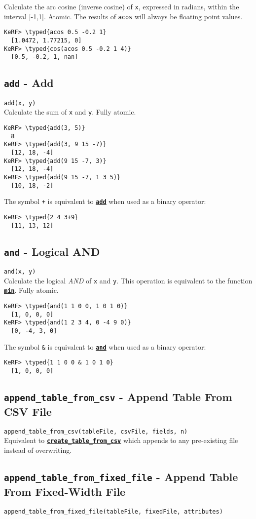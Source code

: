 \documentclass{article}
\newcommand{\typed}[1]{\textcolor{TealBlue}{#1}}
\newcommand{\primdefu}[3]{\subsection{\texttt{#1} - #2}\label{prim:#3}}
\newcommand{\primu}[2]{\hyperref[prim:#2]{\textbf{\texttt{#1}}}}
\newcommand{\primdef}[2]{\primdefu{#1}{#2}{#1}}
\newcommand{\prim}[1]{\primu{#1}{#1}}
\begin{document}
Calculate the arc cosine (inverse cosine) of \texttt{x}, expressed in radians, within the interval [-1,1]. Atomic. The results of \texttt{acos} will always be floating point values.
\begin{Verbatim}
KeRF> \typed{acos 0.5 -0.2 1}
  [1.0472, 1.77215, 0]
KeRF> \typed{cos(acos 0.5 -0.2 1 4)}
  [0.5, -0.2, 1, nan]
\end{Verbatim}

\primdef{add}{Add}
\texttt{add(x, y)}\\

Calculate the sum of \texttt{x} and \texttt{y}. Fully atomic.
\begin{Verbatim}
KeRF> \typed{add(3, 5)}
  8
KeRF> \typed{add(3, 9 15 -7)}
  [12, 18, -4]
KeRF> \typed{add(9 15 -7, 3)}
  [12, 18, -4]
KeRF> \typed{add(9 15 -7, 1 3 5)}
  [10, 18, -2]
\end{Verbatim}

The symbol \texttt{+} is equivalent to \prim{add} when used as a binary operator:
\begin{Verbatim}
KeRF> \typed{2 4 3+9}
  [11, 13, 12]
\end{Verbatim}

\primdef{and}{Logical AND}
\texttt{and(x, y)}\\

Calculate the logical \emph{AND} of \texttt{x} and \texttt{y}. This operation is equivalent to the function \prim{min}. Fully atomic.
\begin{Verbatim}
KeRF> \typed{and(1 1 0 0, 1 0 1 0)}
  [1, 0, 0, 0]
KeRF> \typed{and(1 2 3 4, 0 -4 9 0)}
  [0, -4, 3, 0]
\end{Verbatim}

The symbol \texttt{\&} is equivalent to \prim{and} when used as a binary operator:
\begin{Verbatim}
KeRF> \typed{1 1 0 0 & 1 0 1 0}
  [1, 0, 0, 0]
\end{Verbatim}

\primdefu{append\_table\_from\_csv}{Append Table From CSV File}{appendTableFromCsv}
\texttt{append\_table\_from\_csv(tableFile, csvFile, fields, n)}\\

Equivalent to \primu{create\_table\_from\_csv}{createTableFromCsv} which appends to any pre-existing file instead of overwriting.

\primdefu{append\_table\_from\_fixed\_file}{Append Table From Fixed-Width File}{appendTableFromFixedFile}
\texttt{append\_table\_from\_fixed\_file(tableFile, fixedFile, attributes)}\\
\end{document}
